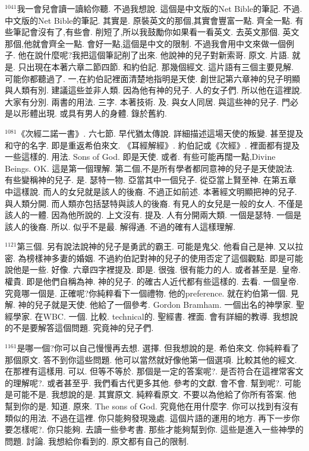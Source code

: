\documentclass{book}
\begin{document}
$^{1041}$我一會兒會讀一讀給你聽.
不過我想說.
這個是中文版的Net Bible的筆記.
不過.
中文版的Net Bible的筆記.
其實是.
原裝英文的那個,其實會豐富一點.
齊全一點.
有些筆記會沒有了,有些會.
削短了,所以我鼓勵你如果看一看英文.
去英文那個.
英文那個,他就會齊全一點.
會好一點,這個是中文的限制.
不過我會用中文來做一個例子.
他在說什麼呢?我把這個筆記削了出來.
他說神的兒子對新索哥.
原文.
片語.
就是.
只出現在本著六章二節四節.
和約伯記.
那幾個經文.
這片語有三個主要見解.
可能你都聽過了.
一,在約伯記裡面清楚地指明是天使.
創世記第六章神的兒子明顯與人類有別.
建議這些並非人類.
因為他有神的兒子.
人的女子們.
所以他在這裡說.
大家有分別.
兩書的用法.
三字.
本著技術.
及.
與女人同居.
與這些神的兒子.
門必是以形體出現.
或具有男人的身體.
錄於舊約.

$^{1081}$《次經二諾一書》.
六七節.
早代猶太傳說.
詳細描述這場天使的叛變.
甚至提及和守的名字.
即是重返希伯來文.
《耳經解經》.
約伯記或《次經》.
裡面都有提及一些這樣的.
用法.
Sons of God.
即是天使.
或者.
有些可能再闊一點,Divine Beings.
OK.
這是第一個理解.
第二個,不是所有學者都同意神的兒子是天使說法.
有些變稱神的兒子.
是.
瑟特一物.
亞當其中一個兒子.
從亞當上賢至神.
在第五章中這樣說.
而人的女兒就是該人的後裔.
不過正如前述.
本著經文明顯把神的兒子.
與人類分開.
而人類亦包括瑟特與該人的後裔.
有見人的女兒是一般的女人.
不僅是該人的一體.
因為他所說的.
上文沒有.
提及.
人有分開兩大類.
一個是瑟特.
一個是該人的後裔.
所以.
似乎不是最.
解得通.
不過的確有人這樣理解.

$^{1121}$第三個.
另有說法說神的兒子是勇武的霸王.
可能是鬼父.
他看自己是神.
又以拉密.
為榜樣神多妻的婚姻.
不過約伯記對神的兒子的使用否定了這個觀點.
即是可能說他是一些.
好像.
六章四字裡提及.
即是.
很強.
很有能力的人.
或者甚至是.
皇帝.
權貴.
即是他們自稱為神.
神的兒子.
的確古人近代都有些這樣的.
去看.
一個皇帝.
究竟哪一個是.
正確呢?你純粹看下一個禮物.
他的preference.
就在約伯第一個.
見解.
神的兒子就是天使.
他給了一個參考.
Gordon Bramham.
一個出名的神學家.
聖經學家.
在WBC.
一個.
比較.
technical的.
聖經書.
裡面.
會有詳細的教導.
我想說的不是要解答這個問題.
究竟神的兒子們.

$^{1161}$是哪一個?你可以自己慢慢再去想.
選擇.
但我想說的是.
希伯來文.
你純粹看了那個原文.
答不到你這些問題.
他可以當然就好像他第一個選項.
比較其他的經文.
在那裡有這樣用.
可以.
但等不等於.
那個是一定的答案呢?.
是否符合在這裡常客文的理解呢?.
或者甚至乎.
我們看古代更多其他.
參考的文獻.
會不會.
幫到呢?.
可能是可能不是.
我想說的是.
其實原文.
純粹看原文.
不要以為他給了你所有答案.
他幫到你的是.
知道.
原來.
The sons of God.
究竟他在用什麼字.
你可以找到有沒有類似的用法.
不過在這裡.
你只能夠發現幾處.
這個片語的運用的地方.
再下一步你要怎樣呢?.
你只能夠.
去讀一些參考書.
那些才能夠幫到你.
這些是進入一些神學的問題.
討論.
我想給你看到的.
原文都有自己的限制.
\end{document}
